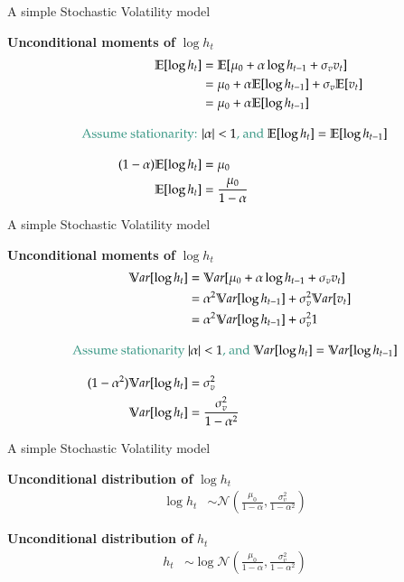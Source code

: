 \documentclass[notes,blackandwhite,mathsans,usenames,dvipsnames]{beamer}
\begin{document}
\begin{frame}{A simple Stochastic Volatility model}

\textbf{Unconditional moments of} $\log h_t$
\begin{align*}
\mathbb{E}[\log h_t] &= \mathbb{E}[\mu_0 + \alpha\log h_{t-1} + \sigma_v v_t]\\
&= \mu_0 + \alpha\mathbb{E}[\log h_{t-1}] + \sigma_v \mathbb{E}[v_t]\\
&= \mu_0 + \alpha\mathbb{E}[\log h_{t-1}] \\[2ex]
\text{\color{mcxs2}Assume stationarity: } & |\alpha|<1\text{\color{mcxs2}, and }\mathbb{E}[\log h_{t}]=\mathbb{E}[\log h_{t-1}]\\[2ex]
(1-\alpha)\mathbb{E}[\log h_t]&= \mu_0 \\
\mathbb{E}[\log h_t]&= \frac{\mu_0 }{1-\alpha}
\end{align*}

\end{frame}



\begin{frame}{A simple Stochastic Volatility model}

\textbf{Unconditional moments of} $\log h_t$
\begin{align*}
\mathbb{V}ar[\log h_t] &= \mathbb{V}ar[\mu_0 + \alpha\log h_{t-1} + \sigma_v v_t]\\
&= \alpha^2\mathbb{V}ar[\log h_{t-1}] + \sigma_v^2 \mathbb{V}ar[v_t]\\
&= \alpha^2\mathbb{V}ar[\log h_{t-1}] + \sigma_v^2 1\\[2ex]
\text{\color{mcxs2}Assume stationarity } & |\alpha|<1\text{\color{mcxs2}, and }\mathbb{V}ar[\log h_{t}]=\mathbb{V}ar[\log h_{t-1}]\\[2ex]
(1-\alpha^2)\mathbb{V}ar[\log h_t]&= \sigma_v^2 \\
\mathbb{V}ar[\log h_t]&= \frac{\sigma_v^2 }{1-\alpha^2}
\end{align*}

\end{frame}



\begin{frame}{A simple Stochastic Volatility model}

\textbf{Unconditional distribution of} $\log h_t$
\begin{align*}
\log h_t &\sim\mathcal{N}\left(\frac{\mu_0 }{1-\alpha},   \frac{\sigma_v^2 }{1-\alpha^2}\right)
\end{align*}

\bigskip\textbf{Unconditional distribution of} $h_t$
\begin{align*}
h_t &\sim\log\mathcal{N}\left(\frac{\mu_0 }{1-\alpha},   \frac{\sigma_v^2 }{1-\alpha^2}\right)
\end{align*}

\end{frame}
\end{document}
